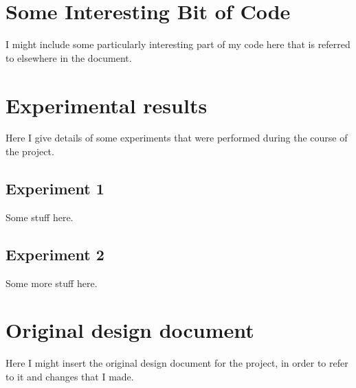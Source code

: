 \documentclass[twocolumn,11pt]{report}
\begin{document}
\appendix


\chapter{Some Interesting Bit of Code}\label{app:Code}

I might include some particularly interesting part of my code here that is
referred to elsewhere in the document.  




\chapter{Experimental results}\label{app:Experiments}

Here I give details of some experiments that were performed during the
course of the project.  

\section{Experiment 1}

Some stuff here.  


\section{Experiment 2}

Some more stuff here.


\chapter{Original design document}\label{app:Original_design}

Here I might insert the original design document for the project, in order
to refer to it and changes that I made.  
\end{document}
